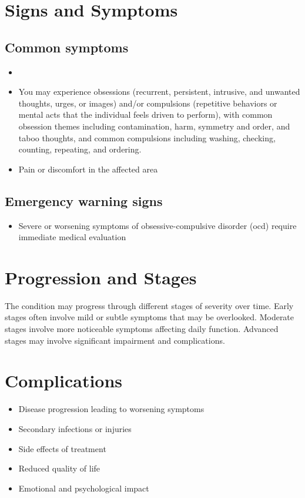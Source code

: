 \section{Signs and Symptoms}
\subsection{Common symptoms}
\begin{itemize}[noitemsep]
  \item \item You may experience obsessions (recurrent, persistent, intrusive, and unwanted thoughts, urges, or images) and/or compulsions (repetitive behaviors or mental acts that the individual feels driven to perform), with common obsession themes including contamination, harm, symmetry and order, and taboo thoughts, and common compulsions including washing, checking, counting, repeating, and ordering.
  \item Pain or discomfort in the affected area
  \end{itemize}
\subsection{Emergency warning signs}
\begin{itemize}[noitemsep]
  \item Severe or worsening symptoms of obsessive-compulsive disorder (ocd) require immediate medical evaluation
\end{itemize}
\section{Progression and Stages}
The condition may progress through different stages of severity over time. Early stages often involve mild or subtle symptoms that may be overlooked. Moderate stages involve more noticeable symptoms affecting daily function. Advanced stages may involve significant impairment and complications.
\section{Complications}
\begin{itemize}[noitemsep]
  \item Disease progression leading to worsening symptoms
  \item Secondary infections or injuries
  \item Side effects of treatment
  \item Reduced quality of life
  \item Emotional and psychological impact
\end{itemize}
